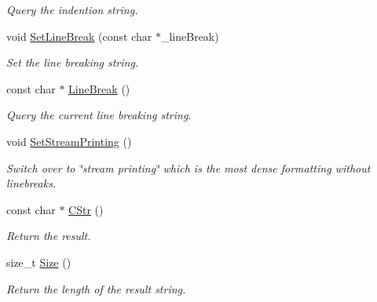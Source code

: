 \begin{DoxyCompactItemize}
\begin{DoxyCompactList}\small\item\em Query the indention string. \end{DoxyCompactList}\item 
void \hyperlink{class_ti_xml_printer_a4be1e37e69e3858c59635aa947174fe6}{Set\+Line\+Break} (const char $\ast$\+\_\+line\+Break)
\begin{DoxyCompactList}\small\item\em Set the line breaking string. \end{DoxyCompactList}\item 
const char $\ast$ \hyperlink{class_ti_xml_printer_a11f1b4804a460b175ec244eb5724d96d}{Line\+Break} ()\hypertarget{class_ti_xml_printer_a11f1b4804a460b175ec244eb5724d96d}{}\label{class_ti_xml_printer_a11f1b4804a460b175ec244eb5724d96d}

\begin{DoxyCompactList}\small\item\em Query the current line breaking string. \end{DoxyCompactList}\item 
void \hyperlink{class_ti_xml_printer_ab23a90629e374cb1cadca090468bbd19}{Set\+Stream\+Printing} ()
\begin{DoxyCompactList}\small\item\em Switch over to \char`\"{}stream printing\char`\"{} which is the most dense formatting without linebreaks. \end{DoxyCompactList}\item 
const char $\ast$ \hyperlink{class_ti_xml_printer_a859eede9597d3e0355b77757be48735e}{C\+Str} ()\hypertarget{class_ti_xml_printer_a859eede9597d3e0355b77757be48735e}{}\label{class_ti_xml_printer_a859eede9597d3e0355b77757be48735e}

\begin{DoxyCompactList}\small\item\em Return the result. \end{DoxyCompactList}\item 
size\+\_\+t \hyperlink{class_ti_xml_printer_ad01375ae9199bd2f48252eaddce3039d}{Size} ()\hypertarget{class_ti_xml_printer_ad01375ae9199bd2f48252eaddce3039d}{}\label{class_ti_xml_printer_ad01375ae9199bd2f48252eaddce3039d}

\begin{DoxyCompactList}\small\item\em Return the length of the result string. \end{DoxyCompactList}\end{DoxyCompactItemize}


